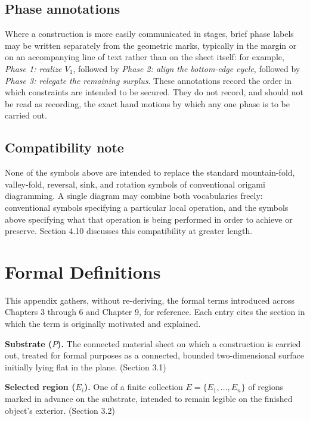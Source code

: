 \documentclass[11pt,oneside]{book}
\begin{document}
\hypertarget{phase-annotations}{%
\section{Phase annotations}\label{phase-annotations}}

Where a construction is more easily communicated in stages, brief phase
labels may be written separately from the geometric marks, typically in
the margin or on an accompanying line of text rather than on the sheet
itself: for example, \emph{Phase 1: realize \(V_1\)}, followed by
\emph{Phase 2: align the bottom-edge cycle}, followed by \emph{Phase 3:
relegate the remaining surplus}. These annotations record the order in
which constraints are intended to be secured. They do not record, and
should not be read as recording, the exact hand motions by which any one
phase is to be carried out.

\hypertarget{compatibility-note}{%
\section{Compatibility note}\label{compatibility-note}}

None of the symbols above are intended to replace the standard
mountain-fold, valley-fold, reversal, sink, and rotation symbols of
conventional origami diagramming. A single diagram may combine both
vocabularies freely: conventional symbols specifying a particular local
operation, and the symbols above specifying what that operation is being
performed in order to achieve or preserve. Section 4.10 discusses this
compatibility at greater length.

\hypertarget{appendix-b.-formal-definitions}{%
\chapter{Formal
Definitions}\label{appendix-b.-formal-definitions}}

This appendix gathers, without re-deriving, the formal terms introduced
across Chapters 3 through 6 and Chapter 9, for reference. Each entry
cites the section in which the term is originally motivated and
explained.

\textbf{Substrate (\(P\)).} The connected material sheet on which a
construction is carried out, treated for formal purposes as a connected,
bounded two-dimensional surface initially lying flat in the plane.
(Section 3.1)

\textbf{Selected region (\(E_i\)).} One of a finite collection
\(E = \{E_1, \ldots, E_n\}\) of regions marked in advance on the
substrate, intended to remain legible on the finished object's exterior.
(Section 3.2)
\end{document}
